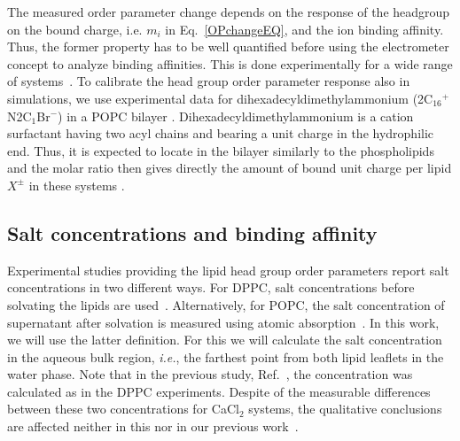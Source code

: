 \documentclass[aip,jcp,twocolumn]{revtex4}
\begin{document}
The measured order parameter change depends on the response of 
the headgroup on the bound charge, i.e. $m_i$ in Eq.~\ref{OPchangeEQ},
and the ion binding affinity. Thus, the former property has to be
well quantified before using the electrometer concept to
analyze binding affinities. This is done experimentally for a wide range
of systems~\cite{seelig87,beschiasvili91}. To calibrate 
the head group order parameter response also in simulations,
we use experimental data for dihexadecyldimethylammonium (2C$_{16}$$^+$N2C$_1$Br$^-$)
in a POPC bilayer \cite{scherer89}. Dihexadecyldimethylammonium
is a cation surfactant having two acyl chains and bearing a unit
charge in the hydrophilic end. Thus, it is expected to locate
in the bilayer similarly to the phospholipids and the molar ratio then 
gives directly the amount of bound unit charge per lipid $X^\pm$ in these systems \cite{scherer87}.

\subsection{Salt concentrations and binding affinity}
Experimental studies providing the lipid head group order
parameters report salt concentrations in two different ways.
For DPPC, salt concentrations before solvating
the lipids are used~\cite{akutsu81}. Alternatively, for POPC,
the salt concentration of supernatant after solvation is
measured using atomic absorption~\cite{altenbach84}.
In this work, we will use the latter definition. For this we
will calculate the salt concentration in the aqueous bulk region,
\textit{i.e.}, the farthest point from both lipid leaflets in the water phase. 
Note that in the previous study, Ref.~,
the concentration was calculated as in the DPPC experiments.
Despite of the measurable differences between these two concentrations for CaCl$_2$ systems,
the qualitative conclusions are affected neither in this
nor in our previous work~\cite{catte16}. 
\end{document}
